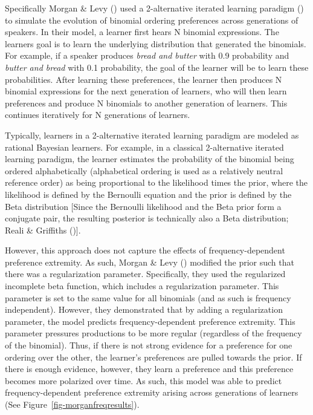 \documentclass[
  12pt,
]{scrartcl}
\begin{document}
Specifically Morgan \& Levy
()
used a 2-alternative iterated learning paradigm
() to simulate the evolution of binomial ordering
preferences across generations of speakers. In their model, a learner
first hears N binomial expressions. The learners goal is to learn the
underlying distribution that generated the binomials. For example, if a
speaker produces \emph{bread and butter} with 0.9 probability and
\emph{butter and bread} with 0.1 probability, the goal of the learner
will be to learn these probabilities. After learning these preferences,
the learner then produces N binomial expressions for the next generation
of learners, who will then learn preferences and produce N binomials to
another generation of learners. This continues iteratively for N
generations of learners.

Typically, learners in a 2-alternative iterated learning paradigm are
modeled as rational Bayesian learners. For example, in a classical
2-alternative iterated learning paradigm, the learner estimates the
probability of the binomial being ordered alphabetically (alphabetical
ordering is used as a relatively neutral reference order) as being
proportional to the likelihood times the prior, where the likelihood is
defined by the Bernoulli equation and the prior is defined by the Beta
distribution {[}Since the Bernoulli likelihood and the Beta prior form a
conjugate pair, the resulting posterior is technically also a Beta
distribution; Reali \& Griffiths
(){]}.

However, this approach does not capture the effects of
frequency-dependent preference extremity. As such, Morgan \& Levy
()
modified the prior such that there was a regularization parameter.
Specifically, they used the regularized incomplete beta function, which
includes a regularization parameter. This parameter is set to the same
value for all binomials (and as such is frequency independent). However,
they demonstrated that by adding a regularization parameter, the model
predicts frequency-dependent preference extremity. This parameter
pressures productions to be more regular (regardless of the frequency of
the binomial). Thus, if there is not strong evidence for a preference
for one ordering over the other, the learner's preferences are pulled
towards the prior. If there is enough evidence, however, they learn a
preference and this preference becomes more polarized over time. As
such, this model was able to predict frequency-dependent preference
extremity arising across generations of learners (See
Figure~\ref{fig-morganfreqresults}).
\end{document}
